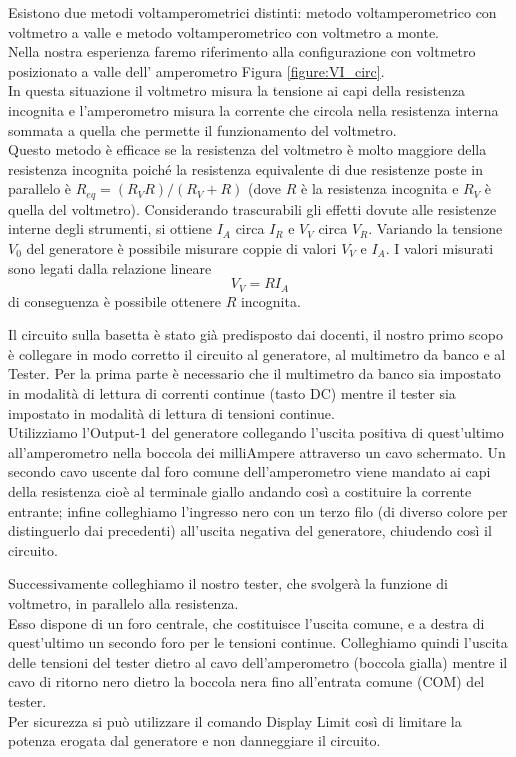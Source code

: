 \documentclass[
    reprint, 
    superscriptaddress, 
    altaffilletter, 
    amsmath, 
    amssymb, 
    a4paper
]{revtex4-2}
\newcommand{\reffig}[1]{Figura {\ref{#1}}}%
\begin{document}
    Esistono due metodi voltamperometrici distinti: metodo voltamperometrico con voltmetro a valle e metodo voltamperometrico con voltmetro a monte.\\
    Nella nostra esperienza faremo riferimento alla configurazione con voltmetro posizionato a valle dell’ amperometro \reffig{figure:VI_circ}.\\
    In questa situazione il voltmetro misura la tensione ai capi della resistenza incognita e l’amperometro misura la corrente che circola nella resistenza interna sommata a quella  che permette il funzionamento del voltmetro.\\
    Questo metodo è efficace se la resistenza del voltmetro è molto maggiore della resistenza incognita poiché la resistenza equivalente di due resistenze poste in parallelo è $R_{eq}=(R_V R)/(R_V+R)$ (dove $R$ è la resistenza incognita e $R_V$ è quella del voltmetro).
    Considerando trascurabili gli effetti dovute alle resistenze interne degli strumenti, si ottiene $I_A$ circa $I_R$ e $V_V$ circa $V_R$. 
    Variando la tensione $V_0$ del generatore è possibile misurare coppie di valori $V_V$ e $I_A$.  I valori misurati sono legati dalla relazione lineare \begin{equation}
        V_V =RI_A \label{equation:VI}
    \end{equation} di conseguenza è possibile ottenere $R$ incognita.

    Il circuito sulla basetta è stato già predisposto dai docenti, il nostro primo scopo è collegare in modo corretto il circuito al generatore, al  multimetro da banco e al Tester.
    Per la prima parte è necessario che il multimetro da banco sia impostato in modalità di lettura di correnti continue (tasto DC) mentre il tester sia impostato in modalità di lettura di tensioni continue.\\
    Utilizziamo l’Output-1 del generatore collegando l’uscita positiva di quest’ultimo  all’amperometro nella boccola dei milliAmpere attraverso un cavo schermato. Un secondo cavo uscente dal foro comune dell’amperometro viene mandato ai capi della resistenza cioè al terminale giallo andando così a costituire la corrente entrante; infine colleghiamo l’ingresso nero con un terzo filo (di diverso colore per distinguerlo dai precedenti) all’uscita negativa del generatore, chiudendo così il circuito.

    Successivamente colleghiamo il nostro tester, che svolgerà la funzione di voltmetro, in parallelo alla resistenza.\\
    Esso dispone di un foro centrale, che costituisce l’uscita comune, e a destra di quest’ultimo un secondo foro per le tensioni continue. Colleghiamo quindi l’uscita delle tensioni del tester dietro al cavo dell’amperometro (boccola gialla) mentre il cavo di ritorno nero dietro la boccola nera fino all'entrata comune (COM) del tester.\\
    Per sicurezza si può utilizzare il comando Display Limit così di limitare la potenza erogata dal generatore e non danneggiare il circuito.
\end{document}
